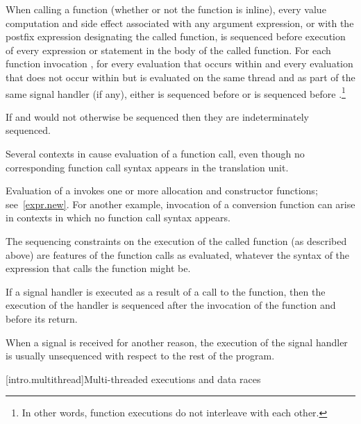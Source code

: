 \pnum
When calling a function (whether or not the function is inline), every
%
value computation and
%
side effect associated with any argument
expression, or with the postfix expression designating the called
function, is sequenced before execution of every expression or statement
in the body of the called function.
For each function invocation ,
for every evaluation  that occurs within  and
every evaluation  that does not occur within  but
is evaluated on the same thread and as part of the same signal handler (if any),
either  is sequenced before  or
 is sequenced before .\footnote{In other words,
function executions do not interleave with each other.}
\begin{note}
If  and  would not otherwise be sequenced then they are
indeterminately sequenced.
\end{note}
Several contexts in \Cpp{} cause evaluation of a function call, even
though no corresponding function call syntax appears in the translation
unit.
\begin{example}
Evaluation of a  invokes one or more allocation
and constructor functions; see~\ref{expr.new}. For another example,
invocation of a conversion function can arise in
contexts in which no function call syntax appears.
\end{example}
The sequencing constraints on the execution of the called function (as
described above) are features of the function calls as evaluated,
whatever the syntax of the expression that calls the function might be.%
%

%
%
\pnum
If a signal handler is executed as a result of a call to the 
function, then the execution of the handler is sequenced after the invocation
of the  function and before its return.
\begin{note}
When a signal is received for another reason, the execution of the
signal handler is usually unsequenced with respect to the rest of the program.
\end{note}

[intro.multithread]{Multi-threaded executions and data races}

